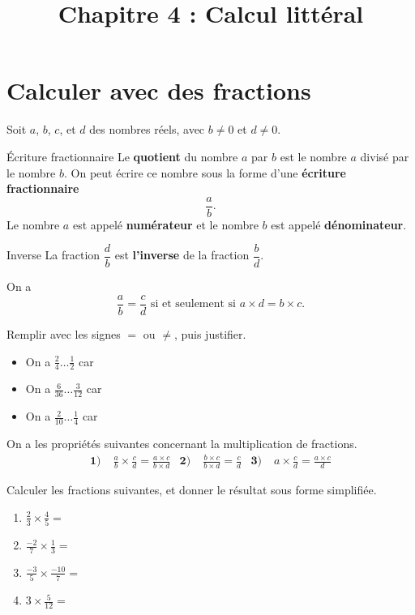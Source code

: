 \documentclass[11pt]{article}
\title{Chapitre 4 : Calcul littéral}
\date{}
\author{}
\begin{document}
\maketitle\thispagestyle{fancy}

\section{Calculer avec des fractions}
\noindent Soit $a$, $b$, $c$, et $d$ des nombres réels, avec $b\neq0$ et $d\neq0$.
\begin{defi}{Écriture fractionnaire}
  Le \textbf{quotient} du nombre $a$ par $b$ est le nombre $a$ divisé par le
  nombre $b$. On peut écrire ce nombre sous la forme d'une \textbf{écriture
  fractionnaire}
  \[
    \frac{a}{b}.
  \]
  Le nombre $a$ est appelé \textbf{numérateur} et le nombre $b$ est appelé
  \textbf{dénominateur}.
\end{defi}
\begin{defi}{Inverse}
  La fraction $\dfrac{d}{b}$ est \textbf{l'inverse} de la fraction
  $\dfrac{b}{d}$.
\end{defi}
\begin{prop}
  On a 
  \[
    \frac{a}{b} = \frac{c}{d}\text{ si et seulement si } a\times d = b\times c.
  \]
\end{prop}
\begin{exemple}
  Remplir avec les signes $=$ ou $\neq$, puis justifier.
  \begin{itemize}
    \item On a $\frac{2}{4}\dots\frac{1}{2}$ car
    \item On a $\frac{6}{36}\dots\frac{3}{12}$ car
    \item On a $\frac{2}{10}\dots\frac{1}{4}$ car
  \end{itemize}
\end{exemple}

\begin{prop}
  On a les propriétés suivantes concernant la multiplication de fractions.
  \begin{align*}
    \textbf{1)}\;& \frac{a}{b}\times\frac{c}{d} = \frac{a\times c}{b\times d} &
    \textbf{2)}\;& \frac{b\times c}{b\times d}= \frac{c}{d} &
    \textbf{3)}\;& a\times\frac{c}{d}=\frac{a\times c}{d}
  \end{align*}
\end{prop}
\begin{exemple}
  Calculer les fractions suivantes, et donner le résultat sous forme simplifiée.
  \begin{multicols}{2}
  \begin{enumerate}
    \item $\frac{2}{3}\times\frac{4}{5} = $
    \item $\frac{-2}{7}\times\frac{1}{3} = $
    \item $\frac{-3}{5}\times\frac{-10}{7} = $
    \item $3\times\frac{5}{12} = $
  \end{enumerate}
\end{multicols}
\end{exemple}
\end{document}
